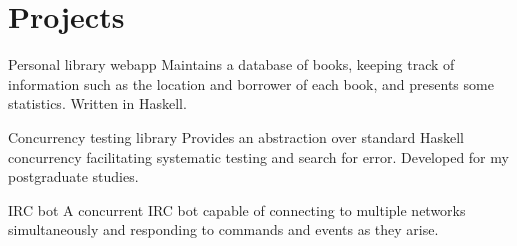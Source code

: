 \documentclass[a4paper]{cv}
\begin{document}
\section{Projects}

  {}
  {Personal library webapp}
  {Maintains a database of books, keeping track of information such as
    the location and borrower of each book, and presents some
    statistics. Written in Haskell.}

  {}
  {Concurrency testing library}
  {Provides an abstraction over standard Haskell concurrency
    facilitating systematic testing and search for error. Developed
    for my postgraduate studies.}

  {}
  {IRC bot}
  {A concurrent IRC bot capable of connecting to multiple
   networks simultaneously and responding to commands and events as
   they arise.}
\end{document}
